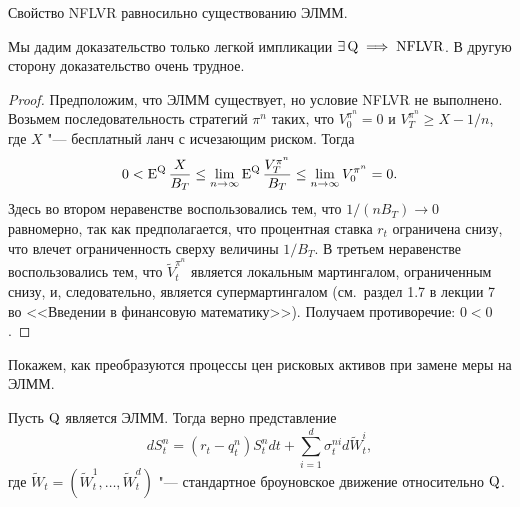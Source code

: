 \begin{theorem}
Свойство NFLVR равносильно существованию ЭЛММ.
\end{theorem}

Мы дадим доказательство только легкой импликации $\exists\,\mathrm{Q} \implies \text{NFLVR}$.
В другую сторону доказательство очень трудное.

\begin{proof}
Предположим, что ЭЛММ существует, но условие NFLVR не выполнено.
Возьмем последовательность стратегий $\pi^n$ таких, что $V_0^{\pi^n} = 0$ и $V_T^{\pi^n} \ge X - 1/n$, где $X$ "--- бесплатный ланч с исчезающим риском. 
Тогда
\[
0 < \operatorname{E}^{\mathrm{Q}}\frac{X}{B_T} \le \lim_{n\to\infty} \operatorname{E}^{\mathrm{Q}}\frac{V^{\pi^n}_T}{B_T} 
 \le \lim_{n\to\infty} V_0^{\pi^n} = 0.
\]
Здесь во втором неравенстве воспользовались тем, что $1/(nB_T) \to 0$ равномерно, так как предполагается, что процентная ставка $r_t$ ограничена снизу, что влечет ограниченность сверху величины $1/B_T$.
В третьем неравенстве воспользовались тем, что $\tilde V_t^{\pi^n}$ является локальным мартингалом, ограниченным снизу, и, следовательно, является супермартингалом (см.~раздел 1.7 в лекции 7 во <<Введении в финансовую математику>>).
Получаем противоречие: $0<0$.
%
\end{proof}

Покажем, как преобразуются процессы цен рисковых активов при замене меры на ЭЛММ.

\begin{proposition}
\label{gen:p:emm-repr}
Пусть $\mathrm{Q}$ является ЭЛММ. Тогда верно представление
\begin{equation}
\label{gen:price-emm}
dS_t^n = (r_t-q_t^n) S_t^n dt + \sum_{i=1}^d \sigma_t^{ni} d\tilde W_t^i, 
\end{equation}
где $\tilde W_t = (\tilde W_t^1,\dots,\tilde W_t^d)$ "--- стандартное броуновское движение относительно $\mathrm{Q}$.
\end{proposition}

